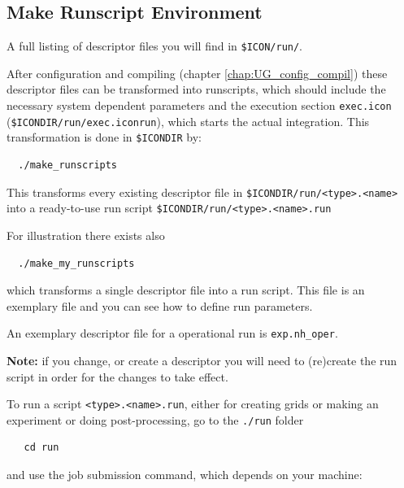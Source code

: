 \subsection{Make Runscript Environment}\label{sec:make_runscript}


A full listing of descriptor files you will find in \verb+$ICON/run/+. 

After configuration and compiling (chapter \ref{chap:UG_config_compil}) these descriptor files can be transformed into runscripts, which should include the necessary system dependent parameters and the execution section \verb+exec.icon+ (\verb+$ICONDIR/run/exec.iconrun+), which starts the actual integration. This transformation is done in \verb+$ICONDIR+ by:

\begin{small}
 \begin{verbatim}
  ./make_runscripts
 \end{verbatim}
\end{small}

This transforms every existing descriptor file in \verb+$ICONDIR/run/<type>.<name>+ into a ready-to-use run script \verb+$ICONDIR/run/<type>.<name>.run+

For illustration there exists also 

\begin{small}
 \begin{verbatim}
  ./make_my_runscripts
 \end{verbatim}
\end{small}

which transforms a single descriptor file into a run script. This file is an exemplary file and you can see how to define run parameters.

An exemplary descriptor file for a operational run is \verb+exp.nh_oper+.

\textbf{Note:} if you change, or create a descriptor you will need to (re)create the run script in order for the changes to take effect.

To run a script \verb+<type>.<name>.run+, either for creating grids or making an experiment or doing post-processing, go to the \verb+./run+ folder

\begin{small}
  \begin{verbatim}
   cd run
  \end{verbatim}
\end{small}

and use the job submission command, which depends on your machine:

